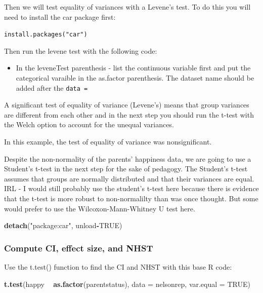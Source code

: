 \documentclass[
]{book}
\newenvironment{Shaded}{\begin{snugshade}}{\end{snugshade}}
\newcommand{\DataTypeTok}[1]{\textcolor[rgb]{0.13,0.29,0.53}{#1}}
\newcommand{\KeywordTok}[1]{\textcolor[rgb]{0.13,0.29,0.53}{\textbf{#1}}}
\newcommand{\NormalTok}[1]{#1}
\newcommand{\OperatorTok}[1]{\textcolor[rgb]{0.81,0.36,0.00}{\textbf{#1}}}
\newcommand{\OtherTok}[1]{\textcolor[rgb]{0.56,0.35,0.01}{#1}}
\newcommand{\StringTok}[1]{\textcolor[rgb]{0.31,0.60,0.02}{#1}}
\providecommand{\tightlist}{%
  \setlength{\itemsep}{0pt}\setlength{\parskip}{0pt}}
\begin{document}
Then we will test equality of variances with a Levene's test. To do this you will need to install the car package first:

\texttt{install.packages("car")}

Then run the levene test with the following code:

\begin{itemize}
\tightlist
\item
  In the leveneTest parenthesis - list the continuous variable first and put the categorical varaible in the as.factor parenthesis. The dataset name should be added after the \texttt{data\ =}
\end{itemize}

A significant test of equality of variance (Levene's) means that group variances are different from each other and in the next step you should run the t-test with the Welch option to account for the unequal variances.

In this example, the test of equality of variance was nonsignificant.

Despite the non-normality of the parents' happiness data, we are going to use a Student's t-test in the next step for the sake of pedagogy. The Student's t-test assumes that groups are normally distributed and that their variances are equal. IRL - I would still probably use the student's t-test here because there is evidence that the t-test is more robust to non-normalilty than was once thought. But some would prefer to use the Wilcoxon-Mann-Whitney U test here.

\begin{Shaded}
\begin{Highlighting}[]
\KeywordTok{detach}\NormalTok{(}\StringTok{"package:car"}\NormalTok{, unload}\OperatorTok{-}\OtherTok{TRUE}\NormalTok{)}
\end{Highlighting}
\end{Shaded}

\hypertarget{compute-ci-effect-size-and-nhst-1}{%
\subsubsection{Compute CI, effect size, and NHST}\label{compute-ci-effect-size-and-nhst-1}}

Use the t.test() function to find the CI and NHST with this base R code:

\begin{Shaded}
\begin{Highlighting}[]
\KeywordTok{t.test}\NormalTok{(happy }\OperatorTok{~}\StringTok{ }\KeywordTok{as.factor}\NormalTok{(parentstatus), }\DataTypeTok{data =}\NormalTok{ nelsonrep, }\DataTypeTok{var.equal =} \OtherTok{TRUE}\NormalTok{)}
\end{Highlighting}
\end{Shaded}
\end{document}
